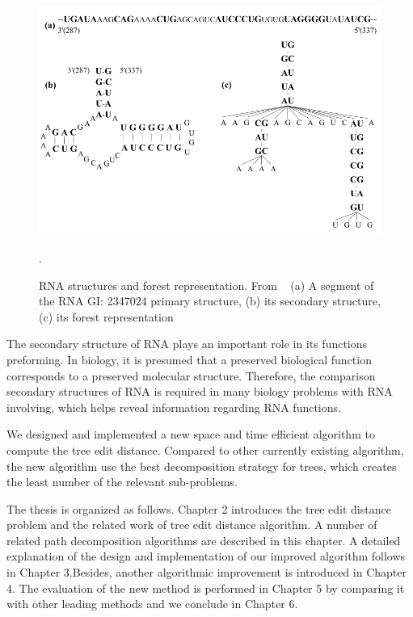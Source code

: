 \begin{figure}
		\centering
		\includegraphics[width=14cm,clip]{Figures/RNATreeRepresentation}
		\label{RNA structures and forest representation} 
		\caption{RNA structures and forest representation. From ~\cite{Liang2012} (a) A segment of the RNA GI: 2347024 primary structure, (b) its secondary structure, (c) its forest representation}. 
\end{figure}

The secondary structure of RNA plays an important role in its functions preforming. In biology, it is presumed that a preserved biological function corresponds to a preserved molecular structure. Therefore, the comparison secondary structures of RNA is required in many biology problems with RNA involving, which helps reveal information regarding RNA functions.

We designed and implemented a new space and time efficient algorithm to compute the tree edit distance. Compared to other currently existing algorithm, the new algorithm use the best decomposition strategy for trees, which creates the least number of the relevant sub-problems. 

The thesis is organized as follows. Chapter 2 introduces the tree edit distance problem and the related work of tree edit distance algorithm. A number of related path decomposition algorithms are described in this chapter. A detailed explanation of the design and implementation of our improved algorithm follows in Chapter 3.Besides, another algorithmic improvement is introduced in Chapter 4. The evaluation of the new method is performed in Chapter 5 by comparing it with other leading methods and we conclude in Chapter 6.
